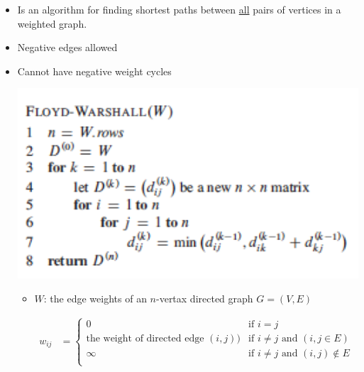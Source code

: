 \documentclass[12pt]{article}
\begin{document}
\begin{enumerate}[1.]
\begin{itemize}
        \begin{itemize}
            \item Is an algorithm for finding shortest paths between \underline{all} pairs of vertices in a weighted graph.
            \item Negative edges allowed
            \item Cannot have negative weight cycles

            \begin{center}
            \includegraphics[width=0.5\linewidth]{images/worksheet_4_solution_46.png}
            \end{center}

            \begin{itemize}
                \item $W$: the edge weights of an $n$-vertax directed graph $G = (V,E)$

                \begin{align}
                    w_{ij} &= \begin{cases}
                        0 & \text{if $i = j$}\\
                        \text{the weight of directed edge $(i,j)$)} & \text{if $i \neq j$ and $(i,j \in E)$}\\
                        \infty & \text{if $i \neq j$ and $(i,j) \notin E$}\\
                    \end{cases}
                \end{align}
            \end{itemize}
        \end{itemize}

    \end{itemize}


\end{enumerate}
\end{document}
